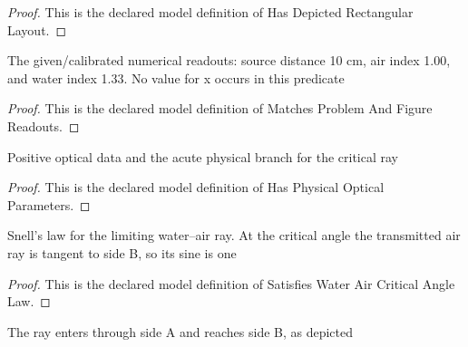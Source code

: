 \begin{proof}
  This is the declared model definition of Has Depicted Rectangular Layout.
\end{proof}
\begin{definition}
  \label{def:physics:phyx-mini-0072:phyxminiproblems-problemphyxmini0072-matchesproblemandfigurereadouts}
  The given/calibrated numerical readouts: source distance 10 cm, air index 1.00, and water index 1.33. No value for x occurs in this predicate
\end{definition}
\begin{proof}
  This is the declared model definition of Matches Problem And Figure Readouts.
\end{proof}
\begin{definition}
  \label{def:physics:phyx-mini-0072:phyxminiproblems-problemphyxmini0072-hasphysicalopticalparameters}
  Positive optical data and the acute physical branch for the critical ray
\end{definition}
\begin{proof}
  This is the declared model definition of Has Physical Optical Parameters.
\end{proof}
\begin{definition}
  \label{def:physics:phyx-mini-0072:phyxminiproblems-problemphyxmini0072-satisfieswateraircriticalanglelaw}
  Snell's law for the limiting water--air ray. At the critical angle the transmitted air ray is tangent to side B, so its sine is one
\end{definition}
\begin{proof}
  This is the declared model definition of Satisfies Water Air Critical Angle Law.
\end{proof}
\begin{definition}
  \label{def:physics:phyx-mini-0072:phyxminiproblems-problemphyxmini0072-followsdepictedsideroute}
  The ray enters through side A and reaches side B, as depicted
\end{definition}
